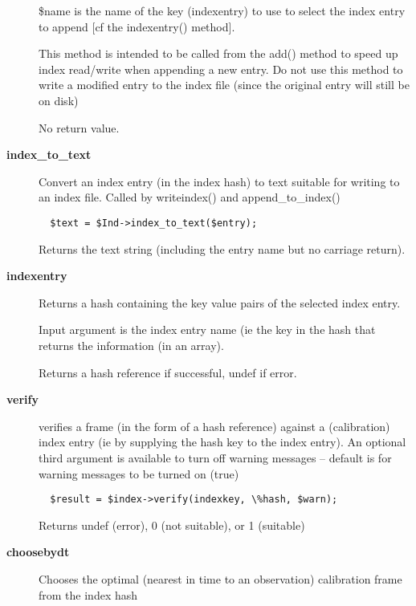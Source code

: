 \begin{description}
\$name is the name of the key (indexentry) to use to select the
index entry to append [cf the indexentry() method].



This method is intended to be called from the add() method
to speed up index read/write when appending a new entry.
Do not use this method to write a modified entry to the
index file (since the original entry will still be on disk)



No return value.

\item[\textbf{index\_to\_text}] \mbox{}

Convert an index entry (in the index hash) to text suitable for
writing to an index file. Called by writeindex() and append\_to\_index()

\begin{verbatim}
  $text = $Ind->index_to_text($entry);
\end{verbatim}


Returns the text string (including the entry name but no carriage 
return).

\item[\textbf{indexentry}] \mbox{}

Returns a hash containing the key value pairs of the
selected index entry.



Input argument is the index entry name (ie the key in the hash
that returns the information (in an array).



Returns a hash reference if successful, undef if error.

\item[\textbf{verify}] \mbox{}

verifies a frame (in the form of a hash reference) against a 
(calibration) index entry (ie by supplying the hash key to the index
entry). An optional third argument is available to turn off warning 
messages -- default is for warning messages to be turned on (true)

\begin{verbatim}
  $result = $index->verify(indexkey, \%hash, $warn);
\end{verbatim}


Returns undef (error), 0 (not suitable), or 1 (suitable)

\item[\textbf{choosebydt}] \mbox{}

Chooses the optimal (nearest in time to an observation) calibration
frame from the index hash


\end{description}
